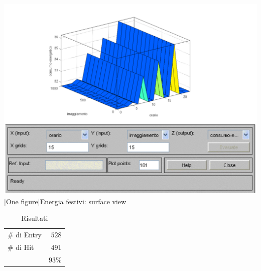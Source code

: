 \includegraphics[scale=0.5]{images/fuzzy/energia_festivi_surface_view.pdf}
[One figure]{Energia festivi: surface view}
\vspace{20px}
\begin{table}
  \caption{Risultati}
  \centering
	\begin{tabular}{lr}
		\toprule
      \# di Entry & $ 528 $ \\
			\# di Hit   & $ 491 $ \\
		\midrule
			& $ 93\% $ \\
		\bottomrule
	\end{tabular}
\end{table}

\clearpage
